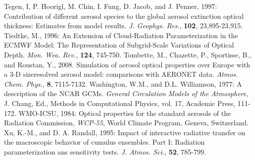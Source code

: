 \decrefname
Tegen, I, P. Hoorigl, M. Chin, I. Fung, D. Jacob, and J. Penner, 1997:
Contribution of different aerosol species to the global aerosol extinction
optical thickness: Estimates from model results. 
{\it J. Geophys. Res.},
{\bf 102},
23,895-23,915.
\decrefname
Tiedtke, M., 1996: An Extension of Cloud-Radiation Parameterization in the ECMWF Model: The Representation of Subgrid-Scale Variations of Optical Depth.
      {\it Mon. Wea. Rev.},
{\bf 124},
745-750.
\decrefname
Tombette, M., Chazette, P., Sportisse, B., and Roustan, Y., 2008.
Simulation of aerosol optical properties over Europe with a 3-D sizeresolved
aerosol model: comparisons with AERONET data.
{\it Atmos. Chem. Phys.}, {\bf 8}, 7115-7132.
\decrefname
Washington, W.M., and D.L. Williamson, 1977:
      A description of the NCAR GCMs.
      {\it General Circulation Models of the Atmosphere},
      J. Chang, Ed., Methods in Computational Physics, vol. 17, Academic Press,
      111-172.
\decrefname
WMO-ICSU, 1984:
      Optical properties for the standard aerosols of the Radiation Commission,
      {\it WCP-55},
      World Climate Program, Geneva, Switzerland.
\decrefname
Xu, K.-M., and D. A. Randall, 1995:
      Impact of interactive radiative transfer on the macroscopic behavior of
      cumulus ensembles. Part I: Radiation parameterization ans sensitivity
      tests.
      {\it J. Atmos. Sci.},
      {\bf 52},
      785-799.
